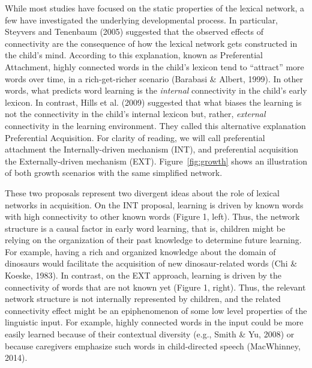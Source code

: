 \documentclass[english,floatsintext,man]{apa6}
\theoremstyle{definition}
\theoremstyle{definition}
\theoremstyle{definition}
\theoremstyle{remark}
\begin{document}
While most studies have focused on the static properties of the lexical
network, a few have investigated the underlying developmental process.
In particular, Steyvers and Tenenbaum (2005) suggested that the observed
effects of connectivity are the consequence of how the lexical network
gets constructed in the child's mind. According to this explanation,
known as Preferential Attachment, highly connected words in the child's
lexicon tend to \enquote{attract} more words over time, in a
rich-get-richer scenario (Barabasi \& Albert, 1999). In other words,
what predicts word learning is the \emph{internal} connectivity in the
child's early lexicon. In contrast, Hills et al. (2009) suggested that
what biases the learning is not the connectivity in the child's internal
lexicon but, rather, \emph{external} connectivity in the learning
environment. They called this alternative explanation Preferential
Acquisition. For clarity of reading, we will call preferential
attachment the Internally-driven mechanism (INT), and preferential
acquisition the Externally-driven mechanism (EXT).
Figure~\ref{fig:growth} shows an illustration of both growth scenarios
with the same simplified network.

These two proposals represent two divergent ideas about the role of
lexical networks in acquisition. On the INT proposal, learning is driven
by known words with high connectivity to other known words (Figure 1,
left). Thus, the network structure is a causal factor in early word
learning, that is, children might be relying on the organization of
their past knowledge to determine future learning. For example, having a
rich and organized knowledge about the domain of dinosaurs would
facilitate the acquisition of new dinosaur-related words (Chi \& Koeske,
1983). In contrast, on the EXT approach, learning is driven by the
connectivity of words that are not known yet (Figure 1, right). Thus,
the relevant network structure is not internally represented by
children, and the related connectivity effect might be an epiphenomenon
of some low level properties of the linguistic input. For example,
highly connected words in the input could be more easily learned because
of their contextual diversity (e.g., Smith \& Yu, 2008) or because
caregivers emphasize such words in child-directed speech (MacWhinney,
2014).
\end{document}
